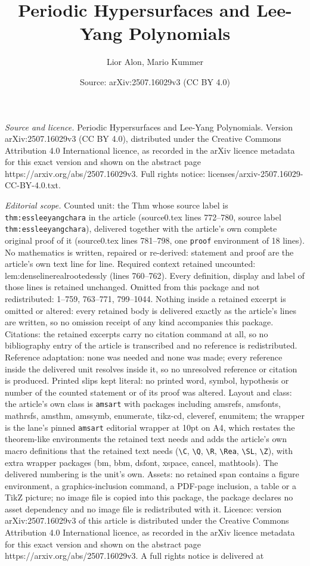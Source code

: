 \documentclass[10pt,a4paper]{amsart}
\title[Periodic Hypersurfaces and Lee-Yang Polynomials]{Periodic Hypersurfaces and Lee-Yang Polynomials}
\author{Lior Alon, Mario Kummer}
\date{Source: arXiv:2507.16029v3 (CC BY 4.0)}
\begin{document}
\maketitle

\noindent\emph{Source and licence.} Periodic Hypersurfaces and Lee-Yang Polynomials. Version arXiv:2507.16029v3 (CC BY 4.0), distributed under the Creative Commons Attribution 4.0 International licence, as recorded in the arXiv licence metadata for this exact version and shown on the abstract page https://arxiv.org/abs/2507.16029v3. Full rights notice: licenses/arxiv-2507.16029-CC-BY-4.0.txt.\par\smallskip

\noindent\textit{Editorial scope.} Counted unit: the Thm whose source label is \texttt{thm:essleeyangchara} in the article (source0.tex lines 772--780, source label \texttt{thm:essleeyangchara}), delivered together with the article's own complete original proof of it (source0.tex lines 781--798, one \texttt{proof} environment of 18 lines). No mathematics is written, repaired or re-derived: statement and proof are the article's own text line for line. Required context retained uncounted: lem:denselinerealrootedessly (lines 760--762). Every definition, display and label of those lines is retained unchanged. Omitted from this package and not redistributed: 1--759, 763--771, 799--1044. Nothing inside a retained excerpt is omitted or altered: every retained body is delivered exactly as the article's lines are written, so no omission receipt of any kind accompanies this package. Citations: the retained excerpts carry no citation command at all, so no bibliography entry of the article is transcribed and no reference is redistributed. Reference adaptation: none was needed and none was made; every reference inside the delivered unit resolves inside it, so no unresolved reference or citation is produced. Printed slips kept literal: no printed word, symbol, hypothesis or number of the counted statement or of its proof was altered. Layout and class: the article's own class is \texttt{amsart} with packages including amsrefs, amsfonts, mathrsfs, amsthm, amssymb, enumerate, tikz-cd, cleveref, enumitem; the wrapper is the lane's pinned \texttt{amsart} editorial wrapper at 10pt on A4, which restates the theorem-like environments the retained text needs and adds the article's own macro definitions that the retained text needs (\texttt{\textbackslash C}, \texttt{\textbackslash Q}, \texttt{\textbackslash R}, \texttt{\textbackslash Rea}, \texttt{\textbackslash SL}, \texttt{\textbackslash Z}), with extra wrapper packages (bm, bbm, dsfont, xspace, cancel, mathtools). The delivered numbering is the unit's own. Assets: no retained span contains a figure environment, a graphics-inclusion command, a PDF-page inclusion, a table or a TikZ picture; no image file is copied into this package, the package declares no asset dependency and no image file is redistributed with it. Licence: version arXiv:2507.16029v3 of this article is distributed under the Creative Commons Attribution 4.0 International licence, as recorded in the arXiv licence metadata for this exact version and shown on the abstract page https://arxiv.org/abs/2507.16029v3. A full rights notice is delivered at 
\end{document}

